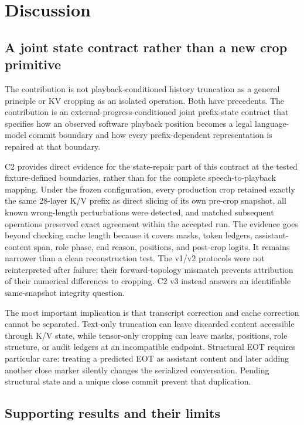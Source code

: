 \section{Discussion}
\label{sec:discussion}

\subsection{A joint state contract rather than a new crop primitive}

The contribution is not playback-conditioned history truncation as a general principle or KV cropping as an isolated operation. Both have precedents. The contribution is an external-progress-conditioned joint prefix-state contract that specifies how an observed software playback position becomes a legal language-model commit boundary and how every prefix-dependent representation is repaired at that boundary.

C2 provides direct evidence for the state-repair part of this contract at the tested fixture-defined boundaries, rather than for the complete speech-to-playback mapping. Under the frozen configuration, every production crop retained exactly the same 28-layer K/V prefix as direct slicing of its own pre-crop snapshot, all known wrong-length perturbations were detected, and matched subsequent operations preserved exact agreement within the accepted run. The evidence goes beyond checking cache length because it covers masks, token ledgers, assistant-content span, role phase, end reason, positions, and post-crop logits. It remains narrower than a clean reconstruction test. The v1/v2 protocols were not reinterpreted after failure; their forward-topology mismatch prevents attribution of their numerical differences to cropping. C2 v3 instead answers an identifiable same-snapshot integrity question.

The most important implication is that transcript correction and cache correction cannot be separated. Text-only truncation can leave discarded content accessible through K/V state, while tensor-only cropping can leave masks, positions, role structure, or audit ledgers at an incompatible endpoint. Structural EOT requires particular care: treating a predicted EOT as assistant content and later adding another close marker silently changes the serialized conversation. Pending structural state and a unique close commit prevent that duplication.

\subsection{Supporting results and their limits}

